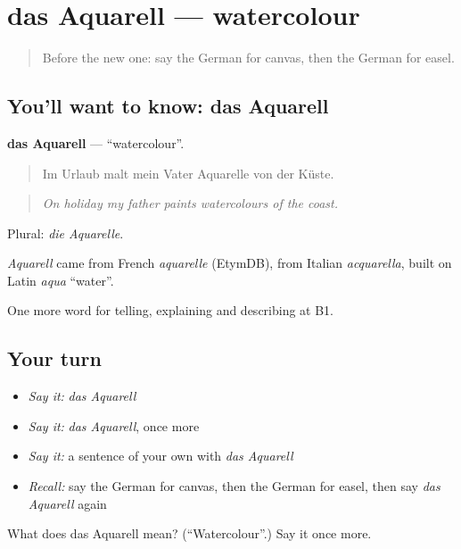 \section[das Aquarell]{das Aquarell — watercolour}

\label{lesson:GE-C518-aquarell}



\begin{quote}
Before the new one: say the German for canvas, then the German for easel.
\end{quote}

\subsection*{You'll want to know: das Aquarell}
\textbf{das Aquarell} — \textquotedblleft{}watercolour\textquotedblright{}.

\begin{quote}
Im Urlaub malt mein Vater Aquarelle von der Küste.
\end{quote}

\begin{quote}
\emph{On holiday my father paints watercolours of the coast.}
\end{quote}

Plural: \emph{die Aquarelle}.

\begin{cousinweb}
\emph{Aquarell} came from French \emph{aquarelle} (EtymDB), from Italian \emph{acquarella}, built on Latin \emph{aqua} \textquotedblleft{}water\textquotedblright{}.
\end{cousinweb}

\begin{grammarlens}[title={What you've built}]
One more word for telling, explaining and describing at B1.
\end{grammarlens}

\subsection*{Your turn}
\begin{itemize}
\raggedright
  \item \emph{Say it:} \emph{das Aquarell}
  \item \emph{Say it:} \emph{das Aquarell}, once more
  \item \emph{Say it:} a sentence of your own with \emph{das Aquarell}
  \item \emph{Recall:} say the German for canvas, then the German for easel, then say \emph{das Aquarell} again
\end{itemize}

\begin{tcolorbox}[breakable,colback=teal!4,colframe=teal!35!black,title={Before you move on}]
What does das Aquarell mean? (\textquotedblleft{}Watercolour\textquotedblright{}.) Say it once more.
\end{tcolorbox}
